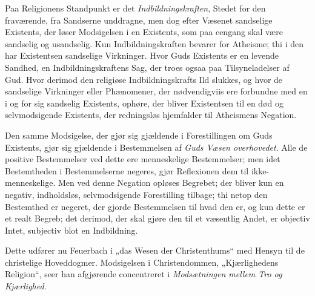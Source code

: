 Paa Religionens Standpunkt er det \emph{Indbildningskraften}, Stedet for den
fraværende, fra Sandserne unddragne, men dog efter Væsenet sandselige
Existents, der løser Modsigelsen i en Existents, som paa eengang skal være
sandselig og usandselig. Kun Indbildningskraften bevarer for Atheisme; thi i
den har Existentsen sandselige Virkninger. Hvor Guds Existents er en levende
Sandhed, en Indbildningskraftens Sag, der troes ogsaa paa Tilsyneladelser af
Gud. Hvor derimod den religiøse Indbildningskrafts Ild slukkes, og hvor de
sandselige Virkninger eller Phænomener, der nødvendigviis ere forbundne med en
i og for sig sandselig Existents, ophøre, der bliver Existentsen til en død og
selvmodsigende Existents, der redningsløs hjemfalder til Atheismens Negation.

Den samme Modsigelse, der gjør sig gjældende i Forestillingen om Guds
Existents, gjør sig gjældende i Bestemmelsen af \emph{Guds Væsen overhovedet}.
Alle de positive Bestemmelser ved dette ere menneskelige Bestemmelser; men idet
Bestemtheden i Bestemmelserne negeres, gjør Reflexionen dem til
ikke-menneskelige. Men ved denne Negation opløses Begrebet; der bliver kun en
negativ, indholdsløs, selvmodsigende Forestilling tilbage; thi netop den
Bestemthed er negeret, der gjorde Bestemmelsen til hvad den er, og kun dette er
et realt Begreb; det derimod, der skal gjøre den til et væsentlig Andet, er
objectiv Intet, subjectiv blot en Indbildning.

Dette udfører nu Feuerbach i „das Wesen der Christenthums“ med Hensyn til de
christelige Hoveddogmer.
Modsigelsen i Christendommen, „Kjærlighedens Religion“, seer
 han afgjørende concentreret i \emph{Modsætningen mellem Tro og Kjærlighed}.

